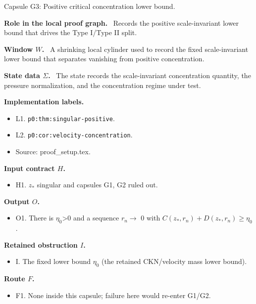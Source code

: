 \documentclass[11pt]{amsart}
\newcommand{\capsulefield}[1]{\par\smallskip\noindent\textbf{#1.}\ }
\begin{document}
\begin{proofcapsule}{Capsule G3: Positive critical concentration lower bound.}
  \capsulefield{Role in the local proof graph}
  Records the positive scale-invariant lower bound that drives the Type I/Type II split.

  \capsulefield{Window \(W\)}
A shrinking local cylinder used to record the fixed scale-invariant lower bound that separates vanishing from positive concentration.

  \capsulefield{State data \(\Sigma\)}
The state records the scale-invariant concentration quantity, the pressure normalization, and the concentration regime under test.

  \capsulefield{Implementation labels}
  \begin{itemize}[leftmargin=1.8em]
  \item L1. \texttt{p0:thm:singular-positive}.
  \item L2. \texttt{p0:cor:velocity-concentration}.
  \item Source: proof\_setup.tex.
  \end{itemize}

  \capsulefield{Input contract \(H\)}
  \begin{itemize}[leftmargin=1.8em]
  \item H1. $z_*$ singular and capsules G1, G2 ruled out.
  \end{itemize}

  \capsulefield{Output \(O\)}
  \begin{itemize}[leftmargin=1.8em]
  \item O1. There is $\eta_0$>0 and a sequence $r_n \to$ 0 with $C(z_*,r_n)+D(z_*,r_n) \ge \eta_0$.
  \end{itemize}

  \capsulefield{Retained obstruction \(I\)}
  \begin{itemize}[leftmargin=1.8em]
  \item I. The fixed lower bound $\eta_0$ (the retained CKN/velocity mass lower bound).
  \end{itemize}

  \capsulefield{Route \(F\)}
  \begin{itemize}[leftmargin=1.8em]
  \item F1. None inside this capsule; failure here would re-enter G1/G2.
  \end{itemize}


\end{proofcapsule}
\end{document}
